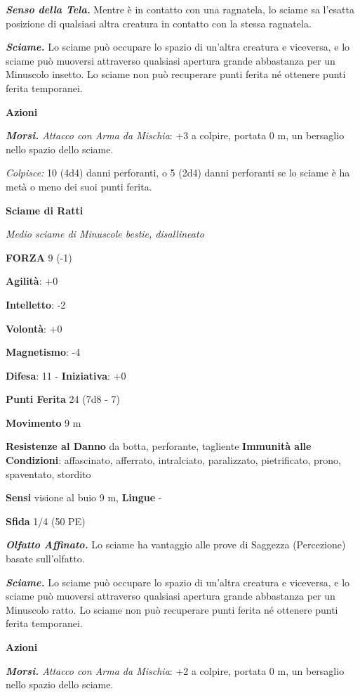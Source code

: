 \begin{multicols}{2}
\emph{\textbf{Senso della Tela.}} Mentre è in contatto con una
ragnatela, lo sciame sa l'esatta posizione di qualsiasi altra creatura
in contatto con la stessa ragnatela.

\emph{\textbf{Sciame.}} Lo sciame può occupare lo spazio di un'altra
creatura e viceversa, e lo sciame può muoversi attraverso qualsiasi
apertura grande abbastanza per un Minuscolo insetto. Lo sciame non può
recuperare punti ferita né ottenere punti ferita temporanei.

\smallskip\textbf{Azioni}

\emph{\textbf{Morsi.} Attacco con Arma da Mischia}: +3 a colpire,
portata 0 m, un bersaglio nello spazio dello sciame.

\emph{Colpisce:} 10 (4d4) danni perforanti, o 5 (2d4) danni perforanti
se lo sciame è ha metà o meno dei suoi punti ferita.

\textbf{Sciame di Ratti}

\emph{Medio sciame di Minuscole bestie, disallineato}

\textbf{FORZA} 9 (-1)

\textbf{Agilità}: +0

\textbf{Intelletto}: -2

\textbf{Volontà}: +0

\textbf{Magnetismo}: -4

\textbf{Difesa}: 11 - \textbf{Iniziativa}: +0

\textbf{Punti Ferita} 24 (7d8 - 7)

\textbf{Movimento} 9 m

\textbf{Resistenze al Danno} da botta, perforante, tagliente
\textbf{Immunità alle Condizioni}: affascinato, afferrato, intralciato,
paralizzato, pietrificato, prono, spaventato, stordito

\textbf{Sensi} visione al buio 9 m, 
\textbf{Lingue} -

\textbf{Sfida} 1/4 (50 PE)\smallskip

\emph{\textbf{Olfatto Affinato.}} Lo sciame ha vantaggio alle prove di
Saggezza (Percezione) basate sull'olfatto.

\emph{\textbf{Sciame.}} Lo sciame può occupare lo spazio di un'altra
creatura e viceversa, e lo sciame può muoversi attraverso qualsiasi
apertura grande abbastanza per un Minuscolo ratto. Lo sciame non può
recuperare punti ferita né ottenere punti ferita temporanei.

\smallskip\textbf{Azioni}

\emph{\textbf{Morsi.} Attacco con Arma da Mischia}: +2 a colpire,
portata 0 m, un bersaglio nello spazio dello sciame.


\end{multicols}
